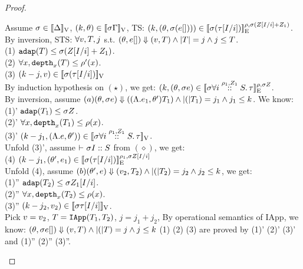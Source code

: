 \documentclass[a4paper,11pt]{article}
\theoremstyle{definition}
\begin{document}
\begin{proof}
\begin{mainitem}
Assume $\ienv \in \lrv{\Delta}$, $(\stepiA, \env) \in \lrv{\ienv \Gamma}$, TS: $(\stepiA, (\env, \ienv (\expr []))) \in \lre{\dmap}{\ienv(\nnatA[I/i] + \nnatA_1)}{\ienv(\type[I/i])}$.\\
%
By inversion, STS: $\forall \valr, \tr, j$ s.t. $(\env, \expr []) \bigstep (\valr, \tr) \land \size{\tr} = j \land j \leq \tr $.\\
(1) $ \adap(\tr) \leq \ienv (\nnatA[I/i] + \nnatA_1)$.\\
(2) $ \forall x, \ddep{x}(\tr) \leq \dmap'(x) $.\\
(3) $ (\stepiA - j, \valr) \in \lrv{\ienv(\type[I/i])}$\\
By induction hypothesis on $(\star)$, we get: $(k, (\env, \ienv \expr) \in \lre{\dmap}{\ienv \nnatA}{\ienv \tforall{\dmap_1}{\nnatA_1}{i} \type}$.\\
%
By inversion, assume $(a) (\env, \ienv \expr) \bigstep ((\eilam \expr_1, \env') \tr_1) \land \size(\tr_1) = j_1 \land j_1 \leq \stepiA$. We know:\\
(1)' $\adap(\tr_1) \leq \ienv \nnatA$.\\
(2)' $\forall x, \ddep{x}(\tr_1) \leq \dmap(x)$.\\
(3)' $(\stepiA - j_1, (\eilam \expr, \env')) \in \lrv{\ienv \tforall{\dmap_1}{\nnatA_1}{i} \type} $.\\
Unfold (3)', assume $\tvdash{} \ienv I ::S$ from $(\diamond)$, we get:\\
(4) $(k - j_1, (\env', \expr_1) \in \lre{\dmap_1}{\ienv \nnatA[I/i]}{\ienv (\type[I/i])}$\\
%
Unfold (4), assume $(b) (\env', \expr ) \bigstep (\valr_2, \tr_2) \land \size(\tr_2) = j_2 \land j_2 \leq \stepiA$,  we get:\\
(1)'' $\adap(\tr_2) \leq \ienv \nnatA_1[I/i]$.\\
(2)'' $\forall x, \ddep{x}(\tr_2) \leq \dmap(x)$.\\
(3)'' $(\stepiA - j_2, \valr_2) \in \lrv{\ienv \type[I/i]}$.\\
Pick $\valr = \valr_2$, $\tr = \triapp{\tr_1}{\tr_2}$, $j = j_1 + j_2$,
By operational semantics of IApp, we know:
$(\env, \ienv \expr []) \bigstep (\valr, \tr) \land \size(\tr) = j \land j \leq \stepiA$
(1) (2) (3) are proved by (1)' (2)' (3)' and (1)'' (2)'' (3)''.\\




\end{mainitem}
\end{proof}
\end{document}
